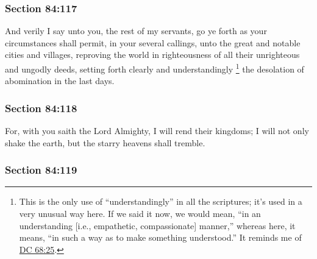 	\subsubsection{Section 84:117} %
		\label{DC84-117}

		And verily I say unto you, the rest of my servants, go ye forth as your circumstances shall permit, in your several callings, unto the great and notable cities and villages, reproving the world in righteousness of all their unrighteous and ungodly deeds, setting forth clearly and understandingly%
			\footnote{%
				This is the only use of ``understandingly'' in all the scriptures; it's used in a very unusual way here. If we said it now, we would mean, ``in an understanding [i.e., empathetic, compassionate] manner,'' whereas here, it means, ``in such a way as to make something understood.'' It reminds me of \hyperref[DC68-25]{DC 68:25}.
				} 
		the desolation of abomination in the last days.


	\subsubsection{Section 84:118} %
		\label{DC84-118}

		For, with you saith the Lord Almighty, I will rend their kingdoms; I will not only shake the earth, but the starry heavens shall tremble.


	\subsubsection{Section 84:119} %
		\label{DC84-119}

